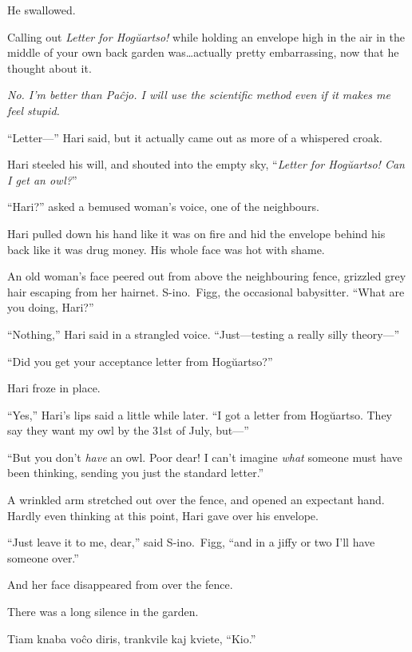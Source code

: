 He swallowed.

Calling out \emph{Letter for Hogŭartso!} while holding an envelope high in the air in the middle of your own back garden was…actually pretty embarrassing, now that he thought about it.

\emph{No. I’m better than Paĉjo. I will use the scientific method even if it makes me feel stupid.}

“Letter—” Hari said, but it actually came out as more of a whispered croak.

Hari steeled his will, and shouted into the empty sky, “\emph{Letter for Hogŭartso! Can I get an owl?}”

“Hari?” asked a bemused woman’s voice, one of the neighbours.

Hari pulled down his hand like it was on fire and hid the envelope behind his back like it was drug money. His whole face was hot with shame.

An old woman’s face peered out from above the neighbouring fence, grizzled grey hair escaping from her hairnet. S\nobreakdash-ino.~Figg, the occasional babysitter. “What are you doing, Hari?”

“Nothing,” Hari said in a strangled voice. “Just—testing a really silly theory—”

“Did you get your acceptance letter from Hogŭartso?”

Hari froze in place.

“Yes,” Hari’s lips said a little while later. “I got a letter from Hogŭartso. They say they want my owl by the 31st of July, but—”

“But you don’t \emph{have} an owl. Poor dear! I can’t imagine \emph{what} someone must have been thinking, sending you just the standard letter.”

A wrinkled arm stretched out over the fence, and opened an expectant hand. Hardly even thinking at this point, Hari gave over his envelope.

“Just leave it to me, dear,” said S\nobreakdash-ino.~Figg, “and in a jiffy or two I’ll have someone over.”

And her face disappeared from over the fence.

There was a long silence in the garden.

Tiam knaba voĉo diris, trankvile kaj kviete, “Kio.”
